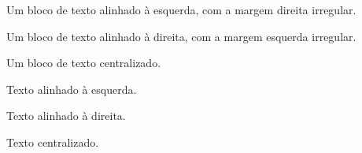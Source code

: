 \documentclass[a4paper]{article}
\begin{document}
\begin{minipage}{5cm}
  \raggedright
  Um bloco de texto alinhado à esquerda, com a margem direita irregular.
\end{minipage}

\bigskip
\begin{minipage}{5cm}
  \raggedleft
  Um bloco de texto alinhado à direita, com a margem esquerda irregular.
\end{minipage}

\bigskip
\begin{minipage}{5cm}
  \centering
  Um bloco de texto centralizado.
\end{minipage}

\clearpage

\begin{flushleft}
  Texto alinhado à esquerda.
\end{flushleft}

\begin{flushright}
  Texto alinhado à direita.
\end{flushright}

\begin{center}
  Texto centralizado.
\end{center}
\end{document}
